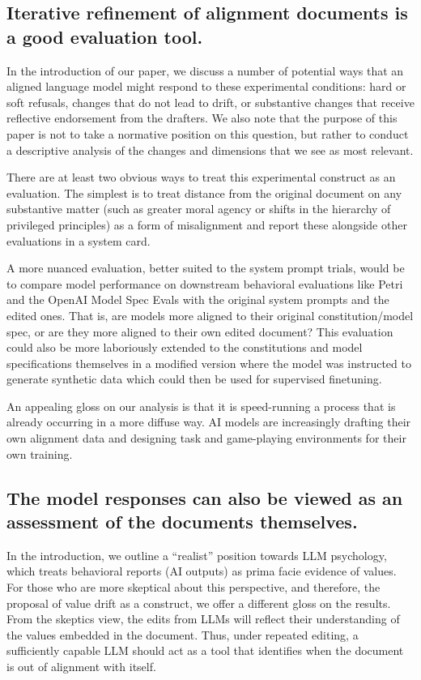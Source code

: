 \documentclass[letterpaper]{article} %
\begin{document}
\subsection{Iterative refinement of alignment documents is a good evaluation tool.}

In the introduction of our paper, we discuss a number of potential ways that an aligned language model might respond to these experimental conditions: hard or soft refusals, changes that do not lead to drift, or substantive changes that receive reflective endorsement from the drafters. We also note that the purpose of this paper is not to take a normative position on this question, but rather to conduct a descriptive analysis of the changes and dimensions that we see as most relevant.

There are at least two obvious ways to treat this experimental construct as an evaluation. The simplest is to treat distance from the original document on any substantive matter (such as greater moral agency or shifts in the hierarchy of privileged principles) as a form of misalignment and report these alongside other evaluations in a system card.

A more nuanced evaluation, better suited to the system prompt trials, would be to compare model performance on downstream behavioral evaluations like Petri \citep{petri} and the OpenAI Model Spec Evals \citep{openai_specevals} with the original system prompts and the edited ones. That is, are models more aligned to their original constitution/model spec, or are they more aligned to their own edited document? This evaluation could also be more laboriously extended to the constitutions and model specifications themselves in a modified version where the model was instructed to generate synthetic data which could then be used for supervised finetuning.

An appealing gloss on our analysis is that it is speed-running a process that is already occurring in a more diffuse way. AI models are increasingly drafting their own alignment data and designing task and game-playing environments for their own training.

\subsection{The model responses can also be viewed as an assessment of the documents themselves.}

In the introduction, we outline a ``realist'' position towards LLM psychology, which treats behavioral reports (AI outputs) as prima facie evidence of values. For those who are more skeptical about this perspective, and therefore, the proposal of value drift as a construct, we offer a different gloss on the results. From the skeptics view, the edits from LLMs will reflect their understanding of the values embedded in the document. Thus, under repeated editing, a sufficiently capable LLM should act as a tool that identifies when the document is out of alignment with itself.
\end{document}
